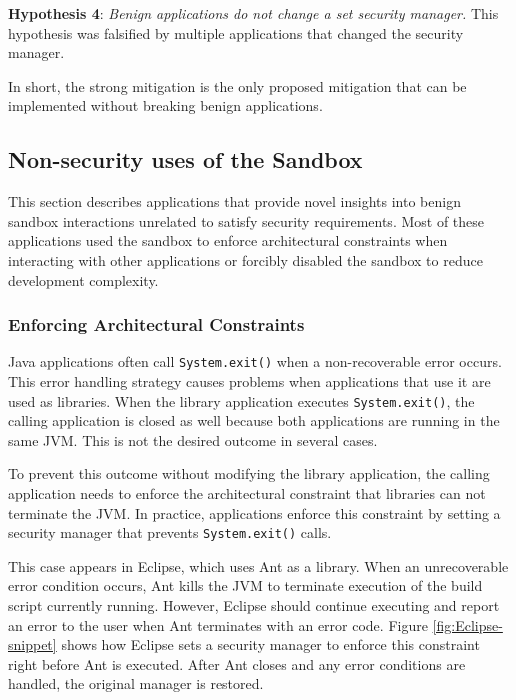 \documentclass{sig-alternate}
\begin{document}
\textbf{Hypothesis 4}: \emph{Benign applications do not change a
set security manager.} This hypothesis was falsified by multiple applications that changed the security manager.

In short, the strong mitigation is the only proposed mitigation that
can be implemented without breaking benign applications.

\subsection{Non-security uses of the Sandbox}\label{sub:Non-security-uses-of}

This section describes applications that provide novel insights into benign sandbox interactions unrelated to satisfy security
requirements. Most of these applications used the
sandbox to enforce architectural constraints when interacting with
other applications or forcibly disabled the sandbox to reduce development
complexity.

\subsubsection{Enforcing Architectural Constraints}

Java applications often call \texttt{System.exit()} when a non-recoverable
error occurs. This error handling strategy causes problems when applications that use it are used as libraries. When the library application executes \texttt{System.exit()},
the calling application is closed as well because both applications
are running in the same JVM. This is not the desired
outcome in several cases. 

To prevent this outcome without modifying the library application,
the calling application needs to enforce the architectural constraint
that libraries can not terminate the JVM. In practice, applications
enforce this constraint by setting a security manager
that prevents \texttt{System.exit()} calls.

This case appears in Eclipse, which uses Ant as a library. When an
unrecoverable error condition occurs, Ant kills the JVM to terminate
execution of the build script currently running. However, Eclipse
should continue executing and report an error to the user when Ant
terminates with an error code. Figure \ref{fig:Eclipse-snippet} shows
how Eclipse sets a security manager to enforce this constraint right
before Ant is executed. After Ant closes and any error conditions
are handled, the original manager is restored.
\end{document}
